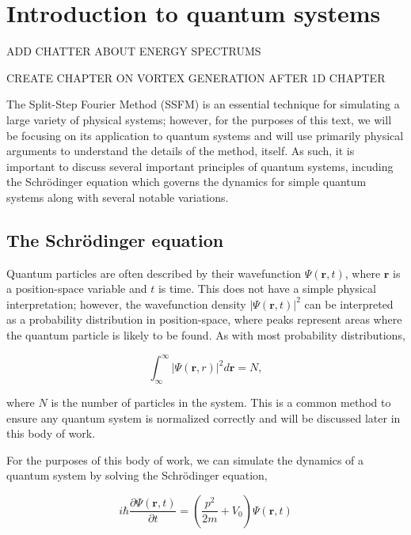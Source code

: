 \chapter*{Introduction to quantum systems}

ADD CHATTER ABOUT ENERGY SPECTRUMS

CREATE CHAPTER ON VORTEX GENERATION AFTER 1D CHAPTER

The Split-Step Fourier Method (SSFM) is an essential technique for simulating a large variety of physical systems; however, for the purposes of this text, we will be focusing on its application to quantum systems and will use primarily physical arguments to understand the details of the method, itself.
As such, it is important to discuss several important principles of quantum systems, incuding the Schr\"odinger equation which governs the dynamics for simple quantum systems along with several notable variations.

\section{The Schr\"odinger equation}
Quantum particles are often described by their wavefunction $\Psi(\mathbf{r},t)$, where $\mathbf{r}$ is a position-space variable and $t$ is time.
This does not have a simple physical interpretation; however, the wavefunction density $|\Psi(\mathbf{r},t)|^2$ can be interpreted as a probability distribution in position-space, where peaks represent areas where the quantum particle is likely to be found.
As with most probability distributions,

\begin{equation}
    \int_\infty^\infty |\Psi(\mathbf{r},r)|^2 d\mathbf{r} = N,
\end{equation}

where $N$ is the number of particles in the system.
This is a common method to ensure any quantum system is normalized correctly and will be discussed later in this body of work.

For the purposes of this body of work, we can simulate the dynamics of a quantum system by solving the Schr\"odinger equation,

\begin{equation}
    i\hbar\frac{\partial\Psi(\mathbf{r},t)}{\partial t} = \left(\frac{p^2}{2m} + V_0\right) \Psi(\mathbf{r},t)
    \label{eqn:schrody}
\end{equation}

